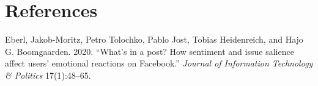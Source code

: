 \documentclass[
  12pt,
]{article}
\begin{document}
\hypertarget{references}{%
\section{References}\label{references}}

\linespread{1}

\hypertarget{refs}{}
\leavevmode\hypertarget{ref-eberl2020what}{}%
Eberl, Jakob-Moritz, Petro Tolochko, Pablo Jost, Tobias Heidenreich, and Hajo G. Boomgaarden. 2020. ``What's in a post? How sentiment and issue salience affect users' emotional reactions on Facebook.'' \emph{Journal of Information Technology \& Politics} 17(1):48--65.
\end{document}
